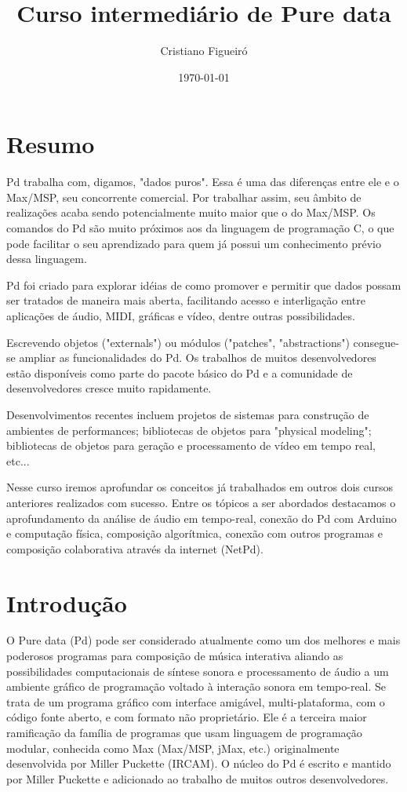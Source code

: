 \documentclass{article}
\title{Curso intermediário de Pure data }
\author{Cristiano Figueiró }
\begin{document}
\date{\today}

\maketitle
\section{ Resumo}


Pd trabalha com, digamos, "dados puros". Essa é uma das diferenças entre ele e o Max/MSP, seu concorrente comercial. Por trabalhar assim, seu âmbito de realizações acaba sendo potencialmente muito maior que o do Max/MSP. Os comandos do Pd são muito próximos aos da linguagem de programação C, o que pode facilitar o seu aprendizado para quem já possui um conhecimento prévio dessa linguagem.

Pd foi criado para explorar idéias de como promover e permitir que dados possam ser tratados de maneira mais aberta, facilitando acesso e interligação entre aplicações de áudio, MIDI, gráficas e vídeo, dentre outras possibilidades.

Escrevendo objetos ("externals") ou módulos ("patches", "abstractions") consegue-se ampliar as funcionalidades do Pd. Os trabalhos de muitos desenvolvedores estão disponíveis como parte do pacote básico do Pd e a comunidade de desenvolvedores cresce muito rapidamente.

Desenvolvimentos recentes incluem projetos de sistemas para construção de ambientes de performances; bibliotecas de objetos para "physical modeling"; bibliotecas de objetos para geração e processamento de vídeo em tempo real, etc...

Nesse curso iremos aprofundar os conceitos já trabalhados em outros dois cursos anteriores realizados com sucesso. Entre os tópicos a ser abordados destacamos o aprofundamento da análise de áudio em tempo-real, conexão do Pd com Arduino e computação física, composição algorítmica, conexão com outros programas e composição colaborativa através da internet (NetPd).



\section{Introdução}


       O Pure data (Pd) pode ser considerado atualmente como um dos melhores e mais
poderosos programas para composição de música interativa aliando as possibilidades
computacionais de síntese sonora e processamento de áudio a um ambiente gráfico de
programação voltado à interação sonora em tempo-real. Se trata de um programa gráfico
com interface amigável, multi-plataforma, com o código fonte aberto, e com formato não
proprietário. Ele é a terceira maior ramificação da família de programas que usam
linguagem de programação modular, conhecida como Max (Max/MSP, jMax, etc.)
originalmente desenvolvida por Miller Puckette (IRCAM). O núcleo do Pd é escrito e
mantido por Miller Puckette e adicionado ao trabalho de muitos outros desenvolvedores.
      
\end{document}
